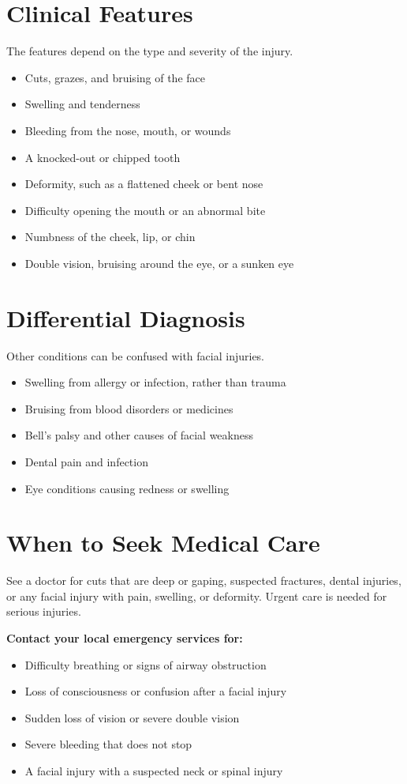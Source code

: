 \section*{Clinical Features}
The features depend on the type and severity of the injury.
\begin{itemize}
    \item Cuts, grazes, and bruising of the face
    \item Swelling and tenderness
    \item Bleeding from the nose, mouth, or wounds
    \item A knocked-out or chipped tooth
    \item Deformity, such as a flattened cheek or bent nose
    \item Difficulty opening the mouth or an abnormal bite
    \item Numbness of the cheek, lip, or chin
    \item Double vision, bruising around the eye, or a sunken eye
\end{itemize}

\section*{Differential Diagnosis}
Other conditions can be confused with facial injuries.
\begin{itemize}
    \item Swelling from allergy or infection, rather than trauma
    \item Bruising from blood disorders or medicines
    \item Bell's palsy and other causes of facial weakness
    \item Dental pain and infection
    \item Eye conditions causing redness or swelling
\end{itemize}

\section*{When to Seek Medical Care}
See a doctor for cuts that are deep or gaping, suspected fractures, dental injuries, or any facial injury with pain, swelling, or deformity. Urgent care is needed for serious injuries.

\textbf{Contact your local emergency services for:}
\begin{itemize}
    \item Difficulty breathing or signs of airway obstruction
    \item Loss of consciousness or confusion after a facial injury
    \item Sudden loss of vision or severe double vision
    \item Severe bleeding that does not stop
    \item A facial injury with a suspected neck or spinal injury
\end{itemize}

